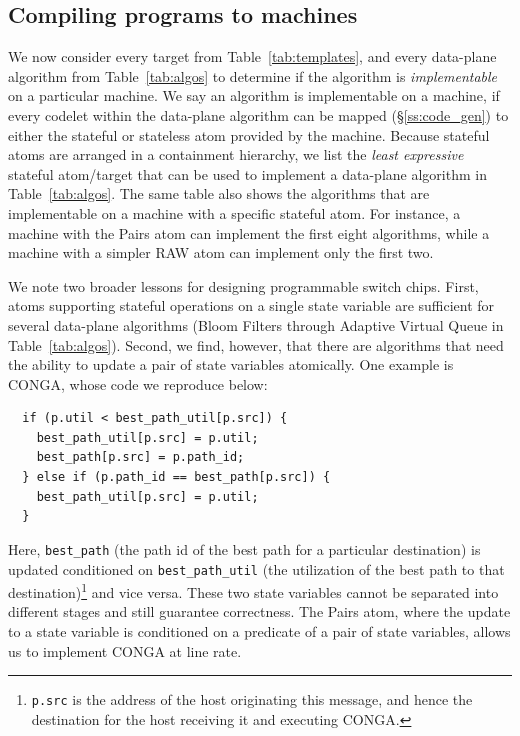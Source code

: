 
\subsection{Compiling \pktlanguage programs to \absmachine machines}

We now consider every target from Table~\ref{tab:templates}, and every
data-plane algorithm from Table~\ref{tab:algos} to determine if the algorithm
is \textit{implementable} on a particular \absmachine machine. We say an
algorithm is implementable on a \absmachine machine, if every codelet within
the data-plane algorithm can be mapped (\S\ref{ss:code_gen}) to either the
stateful or stateless atom provided by the \absmachine machine. Because
stateful atoms are arranged in a containment hierarchy, we list the
\textit{least expressive} stateful atom/target that can be used to implement a
data-plane algorithm in Table~\ref{tab:algos}. The same table also shows the
algorithms that are implementable on a \absmachine machine with a specific
stateful atom. For instance, a \absmachine machine with the Pairs atom can
implement the first eight algorithms, while a machine with a simpler RAW atom
can implement only the first two.

We note two broader lessons for designing programmable switch chips.  First,
atoms supporting stateful operations on a single state variable are sufficient
for several data-plane algorithms (Bloom Filters through Adaptive Virtual Queue
in Table~\ref{tab:algos}). Second, we find, however, that there are algorithms
that need the ability to update a pair of state variables atomically. One
example is CONGA, whose code we reproduce below:
\begin{verbatim}
  if (p.util < best_path_util[p.src]) {
    best_path_util[p.src] = p.util;
    best_path[p.src] = p.path_id;
  } else if (p.path_id == best_path[p.src]) {
    best_path_util[p.src] = p.util;
  }
\end{verbatim}
Here, \texttt{best\_path} (the path id of the best path for a particular
destination) is updated conditioned on \texttt{best\_path\_util} (the
utilization of the best path to that destination)\footnote{{\tt p.src} is the
  address of the host originating this message, and hence the destination for
the host receiving it and executing CONGA.} and vice versa. These two state
variables cannot be separated into different stages and still guarantee
correctness. The Pairs atom, where the update to a state variable is
conditioned on a predicate of a pair of state variables, allows us to implement
CONGA at line rate.

